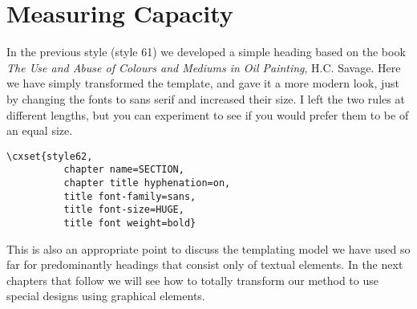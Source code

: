 \restoregeometry



\chapter{Measuring Capacity}

In the previous style (style 61) we developed a simple heading based on the 
book \emph{The Use and Abuse of Colours and Mediums in Oil Painting}, H.C. Savage. Here we have simply transformed the template, and gave it a more modern look, just by changing the fonts to sans serif and increased their size. I left the two rules at different lengths, but you can experiment to see if you would prefer them to be of an equal size.

\begin{verbatim}
\cxset{style62,
          chapter name=SECTION,
          chapter title hyphenation=on,
          title font-family=sans,
          title font-size=HUGE,
          title font weight=bold}
\end{verbatim}



This is also an appropriate point to discuss the templating model we have used so far for predominantly headings that consist only of textual elements. In the next chapters that follow we will see how to totally transform our method to use special designs using graphical elements.

